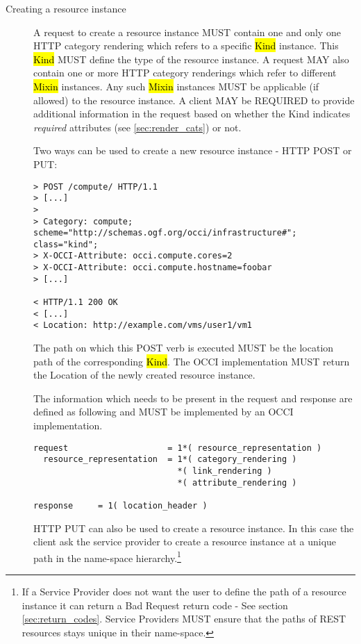 \documentclass[10pt,a4paper]{article}
\begin{document}
\begin{description}
  \item[Creating a resource instance] A request to create a resource
    instance MUST contain one and only one HTTP category rendering
    which refers to a specific \hl{Kind} instance. This \hl{Kind}
    MUST define the type of the resource instance.  A request 
    MAY also contain one or more HTTP category
    renderings which refer to different \hl{Mixin} instances. Any such
    \hl{Mixin} instances MUST be applicable (if allowed) to the
    resource instance.  A client MAY be REQUIRED to provide additional
    information in the request based on whether the Kind indicates 
    \emph{required} attributes (see \ref{sec:render_cats}) or not.
    
    Two ways can be used to create a new resource instance - HTTP POST or PUT:

\begin{verbatim}
> POST /compute/ HTTP/1.1
> [...]
> 
> Category: compute; scheme="http://schemas.ogf.org/occi/infrastructure#"; class="kind"; 
> X-OCCI-Attribute: occi.compute.cores=2
> X-OCCI-Attribute: occi.compute.hostname=foobar
> [...]
 
< HTTP/1.1 200 OK
< [...]
< Location: http://example.com/vms/user1/vm1
\end{verbatim}

    The path on which this POST verb is executed MUST be the location
    path of the corresponding \hl{Kind}. The OCCI
    implementation MUST return the Location of the newly created
    resource instance.

    The information which needs to be present in the request and
    response are defined as following and MUST be implemented by an
    OCCI implementation.

\begin{verbatim}
request                    = 1*( resource_representation )
  resource_representation  = 1*( category_rendering )
                             *( link_rendering )
                             *( attribute_rendering )

response     = 1( location_header )
\end{verbatim}

    HTTP PUT can also be used to create a resource instance. In this
    case the client ask the service provider to create a resource
    instance at a unique path in the name-space
    hierarchy.\footnote{If a Service Provider does not want the user
      to define the path of a resource instance it can return a Bad
      Request return code - See section
      \ref{sec:return_codes}. Service Providers MUST ensure that the
      paths of REST resources stays unique in their name-space.}


\end{description}
\end{document}
